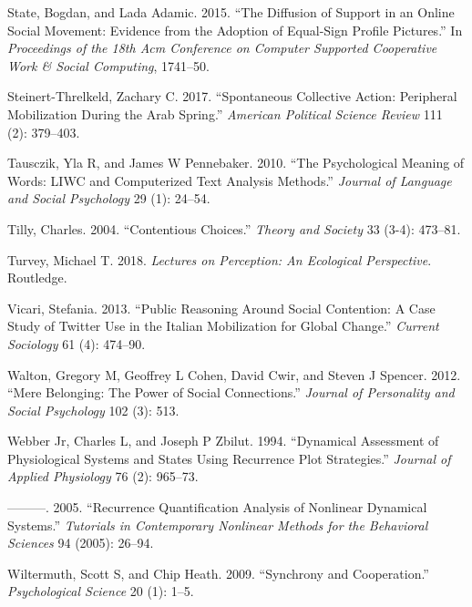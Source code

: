 \documentclass[
  english,
  man]{apa6}
\begin{document}
\leavevmode\hypertarget{ref-state2015diffusion}{}%
State, Bogdan, and Lada Adamic. 2015. ``The Diffusion of Support in an Online Social Movement: Evidence from the Adoption of Equal-Sign Profile Pictures.'' In \emph{Proceedings of the 18th Acm Conference on Computer Supported Cooperative Work \& Social Computing}, 1741--50.

\leavevmode\hypertarget{ref-steinert2017spontaneous}{}%
Steinert-Threlkeld, Zachary C. 2017. ``Spontaneous Collective Action: Peripheral Mobilization During the Arab Spring.'' \emph{American Political Science Review} 111 (2): 379--403.

\leavevmode\hypertarget{ref-tausczik2010psychological}{}%
Tausczik, Yla R, and James W Pennebaker. 2010. ``The Psychological Meaning of Words: LIWC and Computerized Text Analysis Methods.'' \emph{Journal of Language and Social Psychology} 29 (1): 24--54.

\leavevmode\hypertarget{ref-tilly2004contentious}{}%
Tilly, Charles. 2004. ``Contentious Choices.'' \emph{Theory and Society} 33 (3-4): 473--81.

\leavevmode\hypertarget{ref-turvey2018lectures}{}%
Turvey, Michael T. 2018. \emph{Lectures on Perception: An Ecological Perspective}. Routledge.

\leavevmode\hypertarget{ref-vicari2013public}{}%
Vicari, Stefania. 2013. ``Public Reasoning Around Social Contention: A Case Study of Twitter Use in the Italian Mobilization for Global Change.'' \emph{Current Sociology} 61 (4): 474--90.

\leavevmode\hypertarget{ref-walton2012mere}{}%
Walton, Gregory M, Geoffrey L Cohen, David Cwir, and Steven J Spencer. 2012. ``Mere Belonging: The Power of Social Connections.'' \emph{Journal of Personality and Social Psychology} 102 (3): 513.

\leavevmode\hypertarget{ref-webber1994dynamical}{}%
Webber Jr, Charles L, and Joseph P Zbilut. 1994. ``Dynamical Assessment of Physiological Systems and States Using Recurrence Plot Strategies.'' \emph{Journal of Applied Physiology} 76 (2): 965--73.

\leavevmode\hypertarget{ref-webber2005recurrence}{}%
---------. 2005. ``Recurrence Quantification Analysis of Nonlinear Dynamical Systems.'' \emph{Tutorials in Contemporary Nonlinear Methods for the Behavioral Sciences} 94 (2005): 26--94.

\leavevmode\hypertarget{ref-wiltermuth2009synchrony}{}%
Wiltermuth, Scott S, and Chip Heath. 2009. ``Synchrony and Cooperation.'' \emph{Psychological Science} 20 (1): 1--5.
\end{document}
